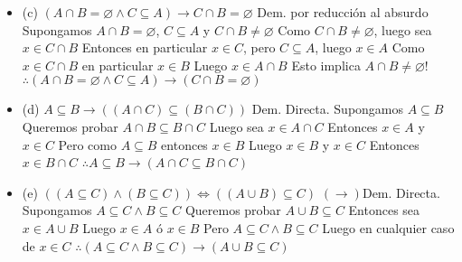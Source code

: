 \begin{itemize}
	 \item (c) $(A \cap B = \varnothing \wedge C \subseteq A) \rightarrow C \cap B = \varnothing$\newline
	 Dem. por reducción al absurdo\newline
	 Supongamos  $A \cap B = \varnothing$, $C \subseteq A$ y $C \cap B \neq \varnothing$\newline
	 Como $C \cap B \neq \varnothing$, luego sea $x \in C \cap B$\newline
	 Entonces en particular $x \in C$, pero $C \subseteq A$, luego $x \in A$\newline
	 Como $x \in C \cap B$ en particular $x \in B$\newline
	 Luego $x \in A \cap B$\newline
	 Esto implica $A\cap B \neq \varnothing!$\newline
	 $\therefore (A \cap B = \varnothing \wedge C \subseteq A) \rightarrow (C \cap B = \varnothing)$
	 
	\item (d) $A \subseteq B \rightarrow ((A \cap C) \subseteq (B \cap C))$\newline
	Dem. Directa. \newline
	Supongamos $A \subseteq B$\newline
	Queremos probar $A \cap B \subseteq B \cap C$\newline
	Luego sea $x \in A \cap C$\newline
	Entonces $x \in A$ y $x \in C$\newline
	Pero como $A \subseteq B$ entonces $x \in B$\newline
	Luego $x \in B$ y $x \in C$\newline
	Entonces $x \in B \cap C$\newline
	$\therefore A \subseteq B \rightarrow (A \cap C \subseteq B \cap C)$
	
	\item (e) $( (A \subseteq C) \wedge (B \subseteq C) ) \iff ((A \cup B) \subseteq C)$\newline
	$(\rightarrow)$Dem. Directa. \newline
	Supongamos $A \subseteq C \wedge B \subseteq C$\newline
	Queremos probar $A \cup B \subseteq C$\newline
	Entonces sea $x \in A \cup B$\newline
	Luego $x \in A$ ó $x \in B$\newline
	Pero $A \subseteq C \wedge B \subseteq C$\newline
	Luego en cualquier caso de $x \in C$\newline
	$\therefore (A \subseteq C \wedge B \subseteq C) \rightarrow (A \cup B \subseteq C)$\newline
	

\end{itemize}
